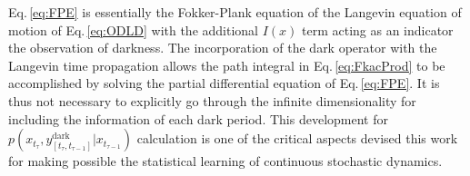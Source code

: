 \documentclass[journal=jpcbfk,manuscript=article,layout=twocolumn,articletitle=true]{achemso}
\begin{document}
Eq.\,\ref{eq:FPE} is essentially the Fokker-Plank equation of the Langevin equation of motion of Eq.\,\ref{eq:ODLD} with the additional $I(x)$ term acting as an indicator the observation of darkness. The incorporation of the dark operator with the Langevin time propagation allows the path integral in Eq.\,\ref{eq:FkacProd} to be accomplished by solving the partial differential equation of Eq.\,\ref{eq:FPE}. It is thus not necessary to explicitly go through the infinite dimensionality for including the information of each dark period. This development for $p(x_{t_\tau},y_{[t_\tau,t_{\tau-1}]}^{\text{dark}} | x_{t_{\tau-1}})$ calculation is one of the critical aspects devised this work for making possible the statistical learning of continuous stochastic dynamics.


\end{document}
